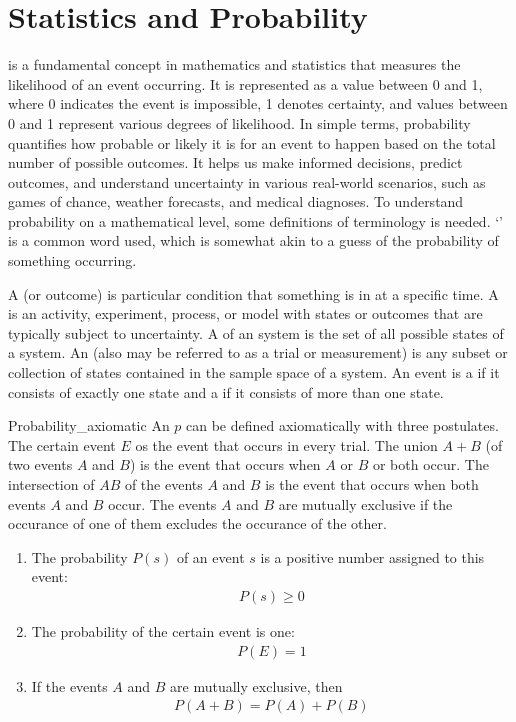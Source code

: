 \chapter{Statistics and Probability}
\thispagestyle{fancy}

 is a fundamental concept in mathematics and statistics that measures the likelihood of an event occurring. It is represented as a value between 0 and 1, where 0 indicates the event is impossible, 1 denotes certainty, and values between 0 and 1 represent various degrees of likelihood. In simple terms, probability quantifies how probable or likely it is for an event to happen based on the total number of possible outcomes. It helps us make informed decisions, predict outcomes, and understand uncertainty in various real-world scenarios, such as games of chance, weather forecasts, and medical diagnoses. To understand probability on a mathematical level, some definitions of terminology is needed. `' is a common word used, which is somewhat akin to a guess of the probability of something occurring.

A  (or outcome) is particular condition that something is in at a specific time. A  is an activity, experiment, process, or model with states or outcomes that are typically subject to uncertainty. A  of an system is the set of all possible states of a system. An  (also may be referred to as a trial or measurement) is any subset or collection of states contained in the sample space of a system. An event is a  if it consists of exactly one state and a  if it consists of more than one state.

\begin{defn}{Probability_axiomatic}
An  $p$ can be defined axiomatically with three postulates. The certain event $E$ os the event that occurs in every trial. The union $A+B$ (of two events $A$ and $B$) is the event that occurs when $A$ or $B$ or both occur. The intersection of $AB$ of the events $A$ and $B$ is the event that occurs when both events $A$ and $B$ occur. The events $A$ and $B$ are mutually exclusive if the occurance of one of them excludes the occurance of the other. 
\begin{enumerate}
\item The probability $P(s)$ of an event $s$ is a positive number assigned to this event:
	\begin{align}
	P(s) \geq 0
	\end{align}
 \item The probability of the certain event is one:
	\begin{align}
	P(E) =1
	\end{align}
  \item If the events $A$ and $B$ are mutually exclusive, then 
	\begin{align}
	P(A+B) = P(A) + P(B)
	\end{align}
\end{enumerate}
\end{defn}

